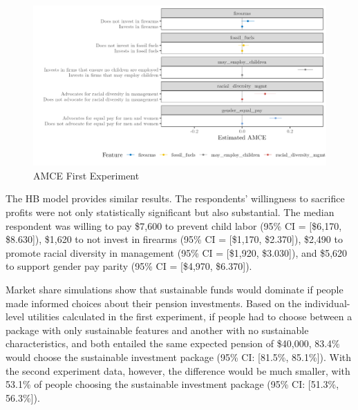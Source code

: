 \documentclass[
  12pt,
]{article}
\begin{document}
\begin{figure}

{\centering \includegraphics{amcecj1jmainb} 

}

\caption{AMCE First Experiment}\label{fig:amce1cjmain}
\end{figure}

The HB model provides similar results. The respondents' willingness to sacrifice profits were not only statistically significant but also substantial. The median respondent was willing to pay \$7,600 to prevent child labor (95\% CI = {[}\$6,170, \$8.630{]}), \$1,620 to not invest in firearms (95\% CI = {[}\$1,170, \$2.370{]}), \$2,490 to promote racial diversity in management (95\% CI = {[}\$1,920, \$3.030{]}), and \$5,620 to support gender pay parity (95\% CI = {[}\$4,970, \$6.370{]}).

Market share simulations show that sustainable funds would dominate if people made informed choices about their pension investments. Based on the individual-level utilities calculated in the first experiment, if people had to choose between a package with only sustainable features and another with no sustainable characteristics, and both entailed the same expected pension of \$40,000, 83.4\% would choose the sustainable investment package (95\% CI: {[}81.5\%, 85.1\%{]}). With the second experiment data, however, the difference would be much smaller, with 53.1\% of people choosing the sustainable investment package (95\% CI: {[}51.3\%, 56.3\%{]}).
\end{document}
